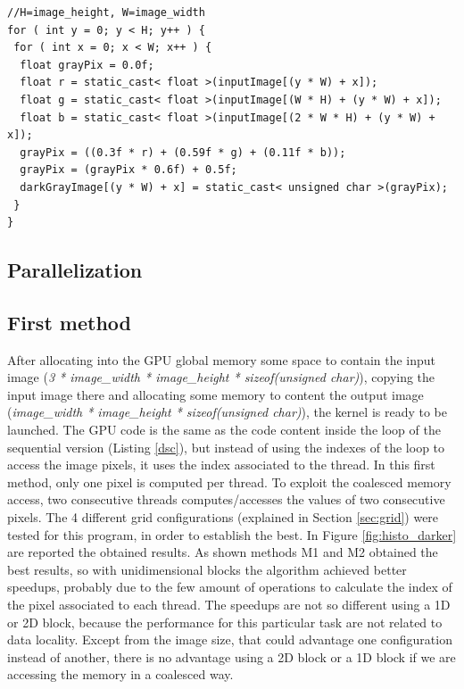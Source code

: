 \documentclass[a4paper]{article}
\begin{document}
\begin{lstlisting}[label=dsc, caption=Darker Sequential code]
//H=image_height, W=image_width
for ( int y = 0; y < H; y++ ) {
 for ( int x = 0; x < W; x++ ) {
  float grayPix = 0.0f;
  float r = static_cast< float >(inputImage[(y * W) + x]);
  float g = static_cast< float >(inputImage[(W * H) + (y * W) + x]);
  float b = static_cast< float >(inputImage[(2 * W * H) + (y * W) + x]);
  grayPix = ((0.3f * r) + (0.59f * g) + (0.11f * b));
  grayPix = (grayPix * 0.6f) + 0.5f;
  darkGrayImage[(y * W) + x] = static_cast< unsigned char >(grayPix);
 }
}
\end{lstlisting}
\FloatBarrier

\subsection{Parallelization}
\label{sec:p1}
\subsection{First method}
\label{sec:dfm}
After allocating into the GPU global memory some space to contain the input image (\textit{3 * image\_width * image\_height * sizeof(unsigned char)}), copying the input image there and allocating some memory to content the output image (\textit{image\_width * image\_height * sizeof(unsigned char)}), the kernel is ready to be launched. The GPU code is the same as the code content inside the loop of the sequential version (Listing \ref{dsc}), but instead of using the indexes of the loop to access the image pixels, it uses the index associated to the thread. In this first method, only one pixel is computed per thread. To exploit the coalesced memory access, two consecutive threads computes/accesses the values of two consecutive pixels. The 4 different grid configurations (explained in Section \ref{sec:grid}) were tested for this program, in order to establish the best. In Figure \ref{fig:histo_darker} are reported the obtained results. As shown methods M1 and M2 obtained the best results, so with unidimensional blocks the algorithm achieved better speedups, probably due to the few amount of operations to calculate the index of the pixel associated to each thread. The speedups are not so different using a 1D or 2D block, because the performance for this particular task are not related to data locality. Except from the image size, that could advantage one configuration instead of another, there is no advantage using a 2D block or a 1D block if we are accessing the memory in a coalesced way.
\end{document}
